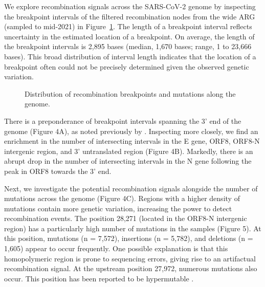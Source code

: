 \documentclass{article}
\begin{document}

We explore recombination signals across the SARS-CoV-2 genome by inspecting the
breakpoint intervals of the filtered recombination nodes from the wide ARG
(sampled to mid-2021) in Figure~\ref{fig:breakpoint-distribution}.
The length of a breakpoint interval reflects
uncertainty in the estimated location of a breakpoint. On average, the length
of the breakpoint intervals is 2,895 bases (median, 1,670 bases; range, 1 to
23,666 bases). This broad distribution of interval length indicates that the
location of a breakpoint often could not be precisely determined given the
observed genetic variation.

\begin{figure}
\centering
\caption{\label{fig:breakpoint-distribution}
Distribution of recombination breakpoints and mutations along the genome.}
\end{figure}

There is a preponderance of breakpoint intervals spanning the 3’ end of the
genome (Figure 4A), as noted previously by
\cite{Turakhia2022-it}.
Inspecting more closely, we find an enrichment in the
number of intersecting intervals in the E gene, ORF8, ORF8-N intergenic region,
and 3’ untranslated region (Figure 4B). Markedly, there is an abrupt drop in
the number of intersecting intervals in the N gene following the peak in ORF8
towards the 3’ end.

Next, we investigate the potential recombination signals alongside the number
of mutations across the genome (Figure 4C). Regions with a higher density of
mutations contain more genetic variation, increasing the power to detect
recombination events. The position 28,271 (located in the ORF8-N intergenic
region) has a particularly high number of mutations in the samples (Figure 5).
At this position, mutations (n = 7,572), insertions (n = 5,782), and deletions
(n = 1,605) appear to occur frequently. One possible explanation is that this
homopolymeric region is prone to sequencing errors, giving rise to an
artifactual recombination signal. At the upstream position 27,972, numerous
mutations also occur. This position has been reported to be hypermutable
\citep{Jungreis2021-dh}.
\end{document}
